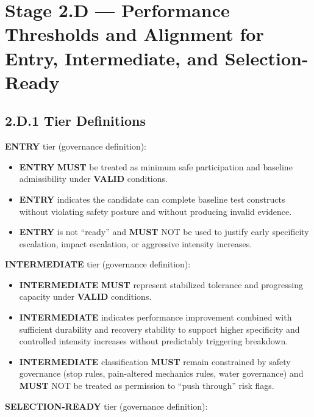 \documentclass[10pt]{article}
\begin{document}
\section*{Stage 2.D — Performance Thresholds and Alignment for Entry, Intermediate, and Selection-Ready}
{}



\subsection*{2.D.1 Tier Definitions}
{}

\textbf{ENTRY} tier (governance definition):

\begin{itemize}
\item \textbf{ENTRY} \textbf{MUST} be treated as minimum safe participation and baseline admissibility under \textbf{VALID} conditions.
\item \textbf{ENTRY} indicates the candidate can complete baseline test constructs without violating safety posture and without producing invalid evidence.
\item \textbf{ENTRY} is not “ready” and \textbf{MUST} NOT be used to justify early specificity escalation, impact escalation, or aggressive intensity increases.
\end{itemize}

\textbf{INTERMEDIATE} tier (governance definition):

\begin{itemize}
\item \textbf{INTERMEDIATE} \textbf{MUST} represent stabilized tolerance and progressing capacity under \textbf{VALID} conditions.
\item \textbf{INTERMEDIATE} indicates performance improvement combined with sufficient durability and recovery stability to support higher specificity and controlled intensity increases without predictably triggering breakdown.
\item \textbf{INTERMEDIATE} classification \textbf{MUST} remain constrained by safety governance (stop rules, pain-altered mechanics rules, water governance) and \textbf{MUST} NOT be treated as permission to “push through” risk flags.
\end{itemize}

\textbf{SELECTION-READY} tier (governance definition):
\end{document}
